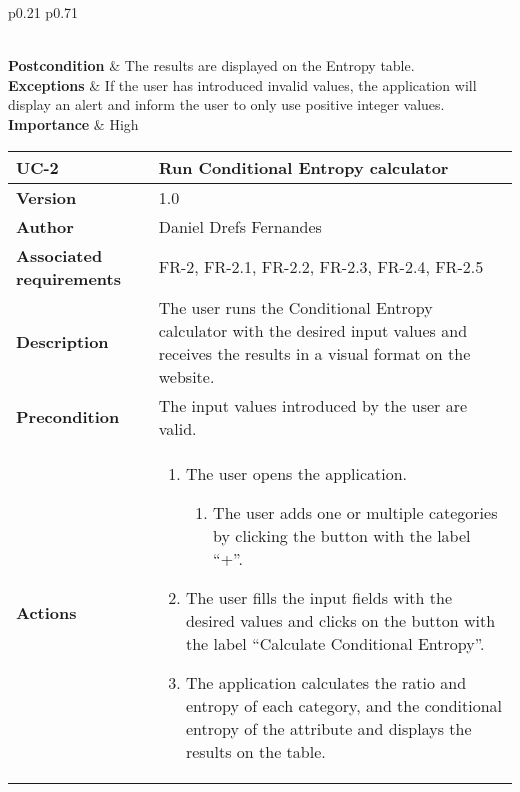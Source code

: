 \begin{table}[p]
\begin{tabularx}{\linewidth}{ p{0.21\columnwidth} p{0.71\columnwidth} }
\begin{enumerate}
\begin{enumerate}
            \end{enumerate}
		\end{enumerate}\\
		\textbf{Postcondition}        & The results are displayed on the Entropy table. \\
		\textbf{Exceptions}          & If the user has introduced invalid values, the application will display an alert and inform the user to only use positive integer values. \\
		\textbf{Importance}          & High \\
		\bottomrule
	\end{tabularx}
	\caption{UC-1 Run Entropy calculator.}
    \label{table:uc_1}
\end{table}

\begin{table}[p]
	\centering
	\begin{tabularx}{\linewidth}{ p{} p{} }
		\toprule
		\textbf{UC-2}    & \textbf{Run Conditional Entropy calculator}\\
		\toprule
		\textbf{Version}              & 1.0    \\
		\textbf{Author}                & Daniel Drefs Fernandes \\
		\textbf{Associated requirements} & FR-2, FR-2.1, FR-2.2, FR-2.3, FR-2.4, FR-2.5 \\
		\textbf{Description}          & The user runs the Conditional Entropy calculator with the desired input values and receives the results in a visual format on the website. \\
		\textbf{Precondition}         & The input values introduced by the user are valid. \\
		\textbf{Actions}             &
		\begin{enumerate}
			\def\labelenumi{\arabic{enumi}.}
			\tightlist
			\item The user opens the application.
            \begin{enumerate}
                \item The user adds one or multiple categories by clicking the button with the label ``+''.
            \end{enumerate}
			\item The user fills the input fields with the desired values and clicks on the button with the label ``Calculate Conditional Entropy''.
            \item The application calculates the ratio and entropy of each category, and the conditional entropy of the attribute and displays the results on the table.

\end{enumerate}
\end{tabularx}
\end{table}
